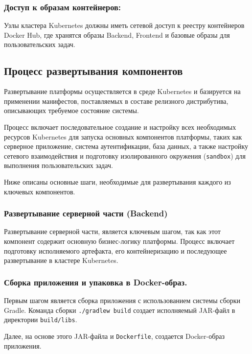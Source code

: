 \subsubsection{Доступ к образам контейнеров:}

Узлы кластера Kubernetes должны иметь сетевой доступ к реестру контейнеров Docker Hub, где хранятся образы Backend, Frontend и базовые образы для пользовательских задач.

\subsection{Процесс развертывания компонентов}

Развертывание платформы осуществляется в среде Kubernetes и базируется на применении манифестов, поставляемых в составе релизного дистрибутива, описывающих требуемое состояние системы.

Процесс включает последовательное создание и настройку всех необходимых ресурсов Kubernetes для запуска основных компонентов платформы, таких как серверное приложение, система аутентификации, база данных, а также настройку сетевого взаимодействия и подготовку изолированного окружения (\texttt{sandbox}) для выполнения пользовательских задач.

Ниже описаны основные шаги, необходимые для развертывания каждого из ключевых компонентов.

\subsubsection{Развертывание серверной части (Backend)}

Развертывание серверной части, является ключевым шагом, так как этот компонент содержит основную бизнес-логику платформы. Процесс включает подготовку исполняемого артефакта, его контейнеризацию и последующее развертывание в кластере Kubernetes.

\subsubsection{Сборка приложения и упаковка в Docker-образ.}

Первым шагом является сборка приложения с использованием системы сборки Gradle. Команда сборки \texttt{./gradlew build} создает исполняемый JAR-файл в директории \texttt{build/libs}.

Далее, на основе этого JAR-файла и \texttt{Dockerfile}, создается Docker-образ приложения.

